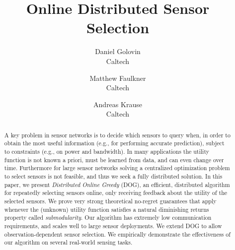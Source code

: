 \documentclass{sig-alternate-dan}
\numberwithin{equation}{section}
\newcommand{\algofont}[1]{\textsc{#1}}
\newcommand{\dog}{\algofont{DOG}\xspace}
\begin{document}
%

\newcommand{\instfont}[1]{\textrm{#1}}
\title{Online Distributed Sensor Selection}%
\author{Daniel Golovin\\Caltech %
%
\and Matthew Faulkner\\Caltech %
%
\and Andreas Krause\\Caltech %
%
%
}

%

%

%

%
%
%
%

%
%

%
%
%

%
%
%
%

%
%
%

\maketitle


%

\begin{abstract}
A key problem in sensor networks is to decide which sensors to query
when, in order to obtain the most useful information (e.g., for performing
accurate prediction), subject to constraints (e.g., on power and
bandwidth). In many applications the utility function is not known a
priori, must be learned from data, and can even change over time.
Furthermore for large sensor networks solving a centralized
optimization problem to select sensors is not feasible, and thus we
seek a fully distributed solution.  In this paper, we present
\emph{Distributed Online Greedy} (\dog), an efficient, distributed
algorithm for repeatedly selecting sensors online, only receiving
feedback about the utility of the selected sensors.  We prove very
strong theoretical no-regret guarantees that apply whenever the
(unknown) utility function satisfies a natural diminishing returns
property called \emph{submodularity}.  Our algorithm has extremely low
communication requirements, and scales well to large sensor
deployments. We extend \dog to allow observation-dependent sensor
selection.  We empirically demonstrate the effectiveness of our
algorithm on several real-world sensing tasks.
%
%
%
%
%
%
%
%
%
%
%
%
%
%
\end{abstract}


%
%
%
%
%
%


%
{}
 
\vspace{-2mm}
\vspace{-2mm}
\end{document}
